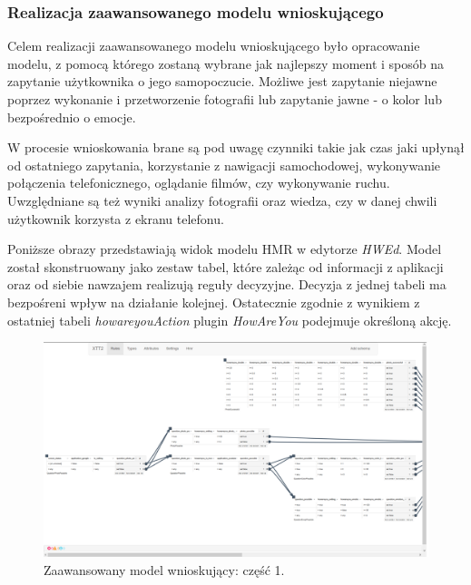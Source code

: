 \subsubsection{Realizacja zaawansowanego modelu wnioskującego}

Celem realizacji zaawansowanego modelu wnioskującego było opracowanie modelu, z pomocą którego zostaną wybrane jak najlepszy moment i sposób na zapytanie użytkownika o jego samopoczucie. Możliwe jest zapytanie niejawne poprzez wykonanie i przetworzenie fotografii lub zapytanie jawne - o kolor lub bezpośrednio o emocje.

W procesie wnioskowania brane są pod uwagę czynniki takie jak czas jaki upłynął od ostatniego zapytania, korzystanie z nawigacji samochodowej, wykonywanie połączenia telefonicznego, oglądanie filmów, czy wykonywanie ruchu. Uwzględniane są też wyniki analizy fotografii oraz wiedza, czy w danej chwili użytkownik korzysta z ekranu telefonu.

Poniższe obrazy przedstawiają widok modelu HMR w edytorze \textit{HWEd}. Model został skonstruowany jako zestaw tabel, które zależąc od informacji z aplikacji oraz od siebie nawzajem realizują reguły decyzyjne. Decyzja z jednej tabeli ma bezpośreni wpływ na działanie kolejnej. Ostatecznie zgodnie z wynikiem z ostatniej tabeli \textit{howareyouAction} plugin \textit{HowAreYou} podejmuje określoną akcję.

\begin{figure}[H]
	\centering
	\includegraphics[scale=0.8]{rozdzial4/HMR_advancedModelPart1.png}
	\caption{Zaawansowany model wnioskujący: część 1.}
\end{figure}

